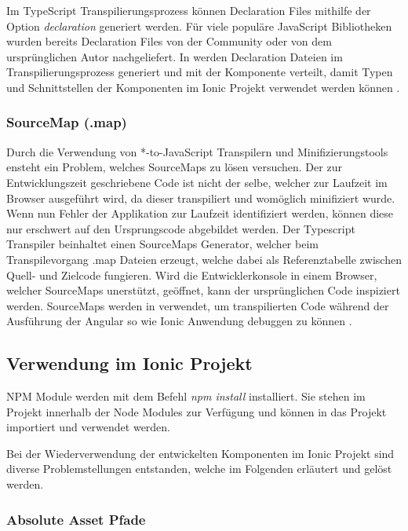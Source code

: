 Im TypeScript Transpilierungsprozess können Declaration Files mithilfe der Option \emph{declaration} generiert werden.
Für viele populäre JavaScript Bibliotheken wurden bereits Declaration Files von der Community oder von dem ursprünglichen Autor nachgeliefert.
In \projectname{} werden Declaration Dateien im Transpilierungsprozess generiert und mit der Komponente verteilt,
damit Typen und Schnittstellen der Komponenten im Ionic Projekt verwendet werden können \cite[471]{EssentialTS}.


\subsubsection{SourceMap (.map)}
Durch die Verwendung von *-to-JavaScript Transpilern und Minifizierungstools ensteht ein Problem, welches SourceMaps zu lösen versuchen.
Der zur Entwicklungszeit geschriebene Code ist nicht der selbe, welcher zur Laufzeit im Browser ausgeführt wird, da dieser transpiliert und womöglich minifiziert wurde.
Wenn nun Fehler der Applikation zur Laufzeit identifiziert werden, können diese nur erschwert auf den Ursprungscode abgebildet werden.
Der Typescript Transpiler beinhaltet einen SourceMaps Generator, welcher beim Transpilevorgang .map Dateien erzeugt,
welche dabei als Referenztabelle zwischen Quell- und Zielcode fungieren.
Wird die Entwicklerkonsole in einem Browser, welcher SourceMaps unerstützt, geöffnet, kann der ursprünglichen Code inspiziert werden.
SourceMaps werden in \projectname{} verwendet, um transpilierten Code während der Ausführung der Angular so wie Ionic Anwendung debuggen zu können
 \cite{Using97:online}.



\subsection{Verwendung im Ionic Projekt}
\ac{NPM} Module werden mit dem Befehl \emph{npm install} installiert.
Sie stehen im Projekt innerhalb der Node Modules zur Verfügung und können in das Projekt importiert und verwendet werden.

Bei der Wiederverwendung der entwickelten Komponenten im Ionic Projekt sind diverse Problemstellungen entstanden,
welche im Folgenden erläutert und gelöst werden.

\subsubsection{Absolute Asset Pfade}
\label{Absolute-Asset-Pfade}

